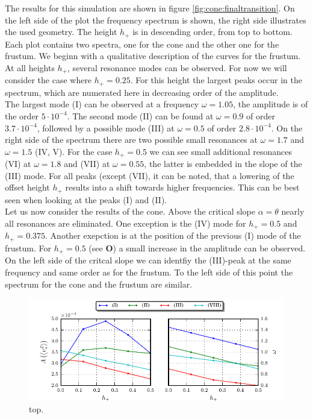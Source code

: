 The results for this simulation are shown in figure \ref{fig:cone:finaltransition}.
On the left side of the plot  the frequency spectrum is shown, the right side illustrates the used geometry.
The height $h_+$ is in descending order, from top to bottom.
Each plot contains two spectra, one for the cone  and the other one for the frustum.
We beginn with a qualitative description of the curves for the frustum.\\
At all heights $h_+$, several resonance modes can be observed. For now we will consider the case where ${h_+=0.25}$.
For this height the largest peaks occur in the spectrum, which are numerated here in decreasing order of the amplitude.\\
The largest mode (\RN{1}) can be observed at a frequency $\omega=1.05$, the amplitude is of the order $5\cdot10^{-4}$.
The second mode (\RN{2}) can be found at $\omega=0.9$ of order $3.7\cdot10^{-4}$, followed by
a possible mode (\RN{3}) at $\omega=0.5$ of order $2.8\cdot10^{-4}$.
On the right side of the spectrum there are two possible small resonances at $\omega=1.7$ and $\omega=1.5$ (\RN{4}, \RN{5}).
For the case $h_+=0.5$  we can see small additional resonances  (\RN{6}) at $\omega=1.8$ and (\RN{7}) at $\omega=0.55$,
the latter is embedded in the slope of the (\RN{3}) mode.
For all peaks (except (\RN{7}), it can be noted, that a lowering of the offset height $h_+$ results
into a shift towards higher frequencies. This can be best seen when looking at the peaks (\RN{1}) and (\RN{2}).\\
Let us now consider the results of the cone.
Above the critical slope $\alpha=\theta$ nearly all resonances are eliminated. One exception is the (\RN{4}) mode for
$h_+=0.5$ and $h_+=0.375$. Another exepction is at the position of the previous (\RN{1}) mode of the frustum.
For $h_+=0.5$ (see \textbf{O}) a small increase in the amplitude can be observed.
On the left side of the critcal slope we can identfiy the (\RN{3})-peak
at the same frequency and same order as for the frustum. To the left side of this point the spectrum for
the cone and the frustum are similar.

\begin{figure}[!bp]
  \centering
  \includegraphics{gfx/cone/final/amp_pos.pdf}
  \caption{
      \label{fig:cone:finalampmax}
    top.
    }
\end{figure}

